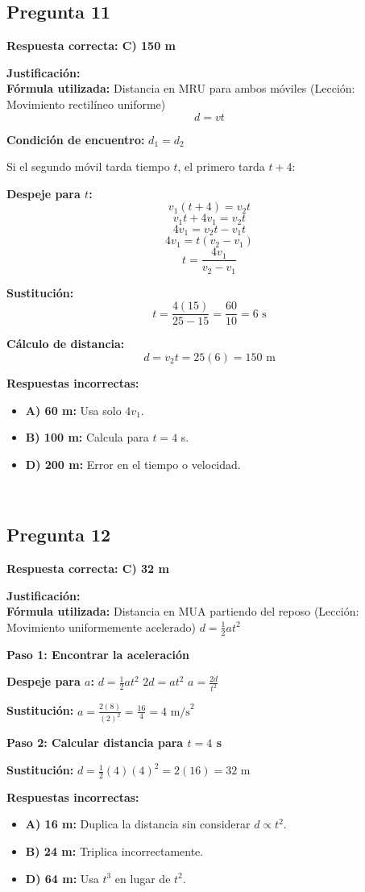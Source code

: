 \begin{respuestabox}
\subsection{Pregunta 11}
\textcolor{verdecorrecto}{\textbf{Respuesta correcta: C) 150 m}}

\textbf{Justificación:}\\
\textbf{Fórmula utilizada:} Distancia en MRU para ambos móviles (Lección: Movimiento rectilíneo uniforme)
$$d = vt$$

\textbf{Condición de encuentro:} $d_1 = d_2$

Si el segundo móvil tarda tiempo $t$, el primero tarda $t + 4$:

\textbf{Despeje para $t$:}
$$v_1(t + 4) = v_2 t$$
$$v_1 t + 4v_1 = v_2 t$$
$$4v_1 = v_2 t - v_1 t$$
$$4v_1 = t(v_2 - v_1)$$
$$t = \frac{4v_1}{v_2 - v_1}$$

\textbf{Sustitución:}
$$t = \frac{4(15)}{25 - 15} = \frac{60}{10} = 6 \text{ s}$$

\textbf{Cálculo de distancia:}
$$d = v_2 t = 25(6) = 150 \text{ m}$$

\textbf{Respuestas incorrectas:}
\begin{itemize}
    \item \textbf{A) 60 m:} Usa solo $4v_1$.
    \item \textbf{B) 100 m:} Calcula para $t = 4$ s.
    \item \textbf{D) 200 m:} Error en el tiempo o velocidad.
\end{itemize}
\end{respuestabox}
\
\begin{respuestabox}
\subsection{Pregunta 12}
\textcolor{verdecorrecto}{\textbf{Respuesta correcta: C) 32 m}}

\textbf{Justificación:}\\
\textbf{Fórmula utilizada:} Distancia en MUA partiendo del reposo (Lección: Movimiento uniformemente acelerado)
$d = \frac{1}{2}at^2$

\textbf{Paso 1: Encontrar la aceleración}

\textbf{Despeje para $a$:}
$d = \frac{1}{2}at^2$
$2d = at^2$
$a = \frac{2d}{t^2}$

\textbf{Sustitución:}
$a = \frac{2(8)}{(2)^2} = \frac{16}{4} = 4 \text{ m/s}^2$

\textbf{Paso 2: Calcular distancia para $t = 4$ s}

\textbf{Sustitución:}
$d = \frac{1}{2}(4)(4)^2 = 2(16) = 32 \text{ m}$

\textbf{Respuestas incorrectas:}
\begin{itemize}
    \item \textbf{A) 16 m:} Duplica la distancia sin considerar $d \propto t^2$.
    \item \textbf{B) 24 m:} Triplica incorrectamente.
    \item \textbf{D) 64 m:} Usa $t^3$ en lugar de $t^2$.
\end{itemize}
\end{respuestabox}
\newpage


